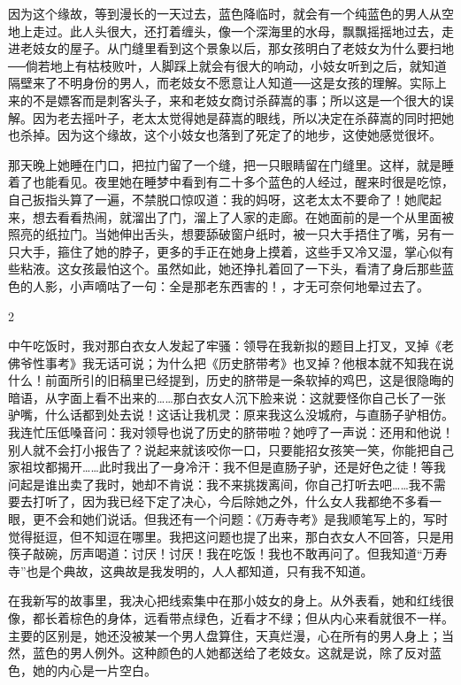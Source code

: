 因为这个缘故，等到漫长的一天过去，蓝色降临时，就会有一个纯蓝色的男人从空地上走过。此人头很大，还打着缠头，像一个深海里的水母，飘飘摇摇地过去，走进老妓女的屋子。从门缝里看到这个景象以后，那女孩明白了老妓女为什么要扫地──倘若地上有枯枝败叶，人脚踩上就会有很大的响动，小妓女听到之后，就知道隔壁来了不明身份的男人，而老妓女不愿意让人知道──这是女孩的理解。实际上来的不是嫖客而是刺客头子，来和老妓女商讨杀薛嵩的事；所以这是一个很大的误解。因为老去摇叶子，老太太觉得她是薛嵩的眼线，所以决定在杀薛嵩的同时把她也杀掉。因为这个缘故，这个小妓女也落到了死定了的地步，这使她感觉很坏。 

那天晚上她睡在门口，把拉门留了一个缝，把一只眼睛留在门缝里。这样，就是睡着了也能看见。夜里她在睡梦中看到有二十多个蓝色的人经过，醒来时很是吃惊，自己扳指头算了一遍，不禁脱口惊叹道：我的妈呀，这老太太不要命了！她爬起来，想去看看热闹，就溜出了门，溜上了人家的走廊。在她面前的是一个从里面被照亮的纸拉门。当她伸出舌头，想要舔破窗户纸时，被一只大手捂住了嘴，另有一只大手，箍住了她的脖子，更多的手正在她身上摸着，这些手又冷又湿，掌心似有些粘液。这女孩最怕这个。虽然如此，她还挣扎着回了一下头，看清了身后那些蓝色的人影，小声嘀咕了一句：全是那老东西害的！，才无可奈何地晕过去了。 

2 

中午吃饭时，我对那白衣女人发起了牢骚：领导在我新拟的题目上打叉，叉掉《老佛爷性事考》我无话可说；为什么把《历史脐带考》也叉掉？他根本就不知我在说什么！前面所引的旧稿里已经提到，历史的脐带是一条软掉的鸡巴，这是很隐晦的暗语，从字面上看不出来的……那白衣女人沉下脸来说：这就要怪你自己长了一张驴嘴，什么话都到处去说！这话让我机灵：原来我这么没城府，与直肠子驴相仿。我连忙压低嗓音问：我对领导也说了历史的脐带啦？她哼了一声说：还用和他说！别人就不会打小报告了？说起来就该咬你一口，只要能招女孩笑一笑，你能把自己家祖坟都揭开……此时我出了一身冷汗：我不但是直肠子驴，还是好色之徒！等我问起是谁出卖了我时，她却不肯说：我不来挑拨离间，你自己打听去吧……我不需要去打听了，因为我已经下定了决心，今后除她之外，什么女人我都绝不多看一眼，更不会和她们说话。但我还有一个问题：《万寿寺考》是我顺笔写上的，写时觉得挺逗，但不知逗在哪里。我把这问题也提了出来，那白衣女人不回答，只是用筷子敲碗，厉声喝道：讨厌！讨厌！我在吃饭！我也不敢再问了。但我知道“万寿寺”也是个典故，这典故是我发明的，人人都知道，只有我不知道。 

在我新写的故事里，我决心把线索集中在那小妓女的身上。从外表看，她和红线很像，都长着棕色的身体，远看带点绿色，近看才不绿；但从内心来看就很不一样。主要的区别是，她还没被某一个男人盘算住，天真烂漫，心在所有的男人身上；当然，蓝色的男人例外。这种颜色的人她都送给了老妓女。这就是说，除了反对蓝色，她的内心是一片空白。 

